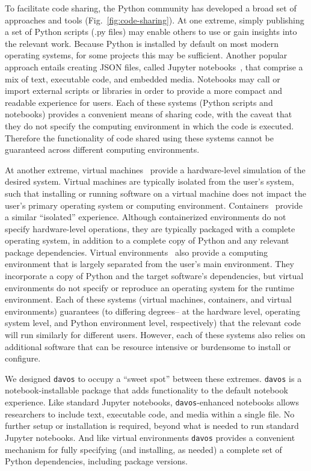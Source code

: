 \documentclass[preprint,12pt, a4paper]{elsarticle}
\begin{document}
To facilitate code sharing, the Python community has developed a broad
set of approaches and tools (Fig.~\ref{fig:code-sharing}).  At one
extreme, simply publishing a set of Python scripts (.py files) may
enable others to use or gain insights into the relevant work.  Because
Python is installed by default on most modern operating systems, for
some projects this may be sufficient.  Another popular approach
entails creating JSON files, called Jupyter
notebooks~\citep{KluyEtal16}, that comprise a mix of text, executable
code, and embedded media.  Notebooks may call or import external
scripts or libraries in order to provide a more compact and readable
experience for users.  Each of these systems (Python scripts and
notebooks) provides a convenient means of sharing code, with the
caveat that they do not specify the computing environment in which the
code is executed.  Therefore the functionality of code shared using
these systems cannot be guaranteed across different computing
environments.

At another extreme, virtual machines~\citep{Gold74, AltiEtal05,
  vmware} provide a hardware-level simulation of the desired system.
Virtual machines are typically isolated from the user's system, such
that installing or running software on a virtual machine does not
impact the user's primary operating system or computing environment.
Containers~\citep[e.g.,][]{Merk14, KurtEtal17} provide a similar
``isolated'' experience.  Although containerized environments do not
specify hardware-level operations, they are typically packaged with a
complete operating system, in addition to a complete copy of Python
and any relevant package dependencies.  Virtual
environments~\citep[e.g.,][]{vanREtal14} also provide a computing
environment that is largely separated from the user's main
environment.  They incorporate a copy of Python and the target
software's dependencies, but virtual environments do not specify or
reproduce an operating system for the runtime environment.  Each of
these systems (virtual machines, containers, and virtual environments)
guarantees (to differing degrees-- at the hardware level, operating
system level, and Python environment level, respectively) that the
relevant code will run similarly for different users.  However, each
of these systems also relies on additional software that can be
resource intensive or burdensome to install or configure.

We designed \texttt{davos} to occupy a ``sweet spot'' between these
extremes.  \texttt{davos} is a notebook-installable package that adds
functionality to the default notebook experience.  Like standard
Jupyter notebooks, \texttt{davos}-enhanced notebooks allows
researchers to include text, executable code, and media within a
single file.  No further setup or installation is required, beyond
what is needed to run standard Jupyter notebooks.  And like virtual
environments \texttt{davos} provides a convenient mechanism for fully
specifying (and installing, as needed) a complete set of Python
dependencies, including package versions.
\end{document}
